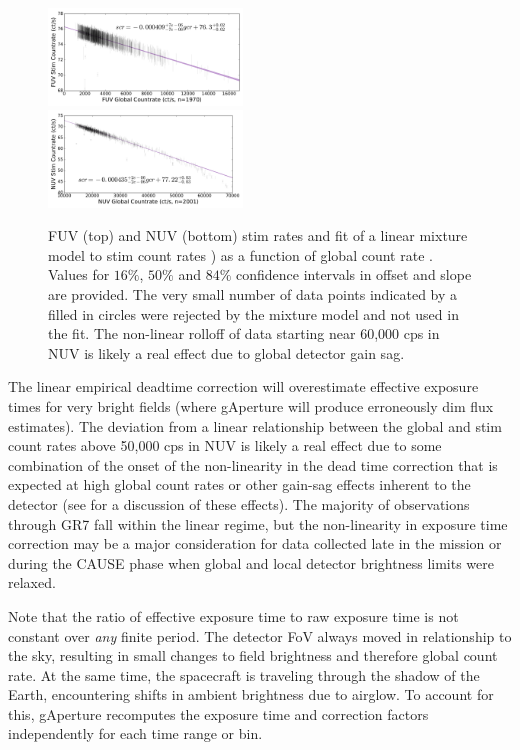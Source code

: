 \documentclass[trackchanges,preprint2]{aastex}
\begin{document}
\begin{figure}[h!]
\includegraphics[width=0.46\textwidth,keepaspectratio]{Fig10a.pdf}\\
\includegraphics[width=0.46\textwidth,keepaspectratio]{Fig10b.pdf}
\caption{FUV (top) and NUV (bottom) stim rates and fit of a linear mixture model to stim count rates ) as a function of global count rate . Values for $16\%$, $50\%$ and $84\%$ confidence intervals in offset and slope are provided. The very small number of data points indicated by a filled in circles were rejected by the mixture model and not used in the fit. The non-linear rolloff of data starting near 60,000 cps in NUV is likely a real effect due to global detector gain sag.
\label{stim}}
\end{figure}

The linear empirical deadtime correction will overestimate effective exposure times for very bright fields (where gAperture will produce erroneously dim flux estimates). The deviation from a linear relationship between the global and stim count rates above 50,000 cps in NUV is likely a real effect due to some combination of the onset of the non-linearity in the dead time correction that is expected at high global count rates or other gain-sag effects inherent to the detector (see \citet{mor2007} for a discussion of these effects). The majority of observations through GR7 fall within the linear regime, but the non-linearity in exposure time correction may be a major consideration for data collected late in the mission or during the CAUSE phase when global and local detector brightness limits were relaxed.

Note that the ratio of effective exposure time to raw exposure time is not constant over \emph{any} finite period. The detector FoV always moved in relationship to the sky, resulting in small changes to field brightness and therefore global count rate. At the same time, the spacecraft is traveling through the shadow of the Earth, encountering shifts in ambient brightness due to airglow. To account for this, gAperture recomputes the exposure time and correction factors independently for each time range or bin.
\end{document}
